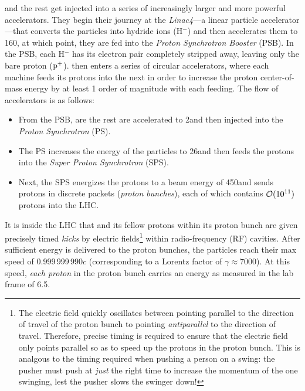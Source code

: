 \pname and the rest get injected into a series of increasingly larger and more powerful accelerators.
They begin their journey at the \emph{Linac4}---a linear particle accelerator---that converts the particles into hydride ions (H$^-$) and then accelerates them to 160\MeV, at which point, they are fed into the \emph{Proton Synchrotron Booster} (PSB).
In the PSB, each H$^-$ has its electron pair completely stripped away, leaving only the bare proton ($\mathrm{p}^+$).
\pname then enters a series of circular accelerators, where each machine feeds its protons into the next in order to increase the proton center-of-mass energy by at least 1 order of magnitude with each feeding.
The flow of accelerators is as follows:
\begin{itemize}
    \item From the PSB, \pname are the rest are accelerated to 2\GeV and then injected into the \emph{Proton Synchrotron} (PS).
    \item The PS increases the energy of the particles to 26\GeV and then feeds the protons into the \emph{Super Proton Synchrotron} (SPS).
    \item Next, the SPS energizes the protons to a beam energy of 450\GeV and sends protons in discrete packets (\emph{proton bunches}), each of which contains $\mathcal{O}(\text{10}^\text{11})$ protons into the LHC. %
\end{itemize}
It is inside the LHC that \pname and its fellow protons within its proton bunch are given precisely timed \emph{kicks} by electric fields\footnote{
    The electric field quickly oscillates between pointing parallel to the direction of travel of the proton bunch to pointing \emph{antiparallel} to the direction of travel.
    Therefore, precise timing is required to ensure that the electric field only points parallel so as to speed up the protons in the proton bunch.
    This is analgous to the timing required when pushing a person on a swing:
    the pusher must push at \emph{just} the right time to increase the momentum of the one swinging, lest the pusher slows the swinger down!
} within radio-frequency (RF) cavities.
After sufficient energy is delivered to the proton bunches, the particles reach their max speed of 0.999\,999\,990$c$ (corresponding to a Lorentz factor of $\gamma \approx 7000$). %
At this speed, \emph{each proton} in the proton bunch carries an energy as measured in the lab frame of 6.5\TeV.

